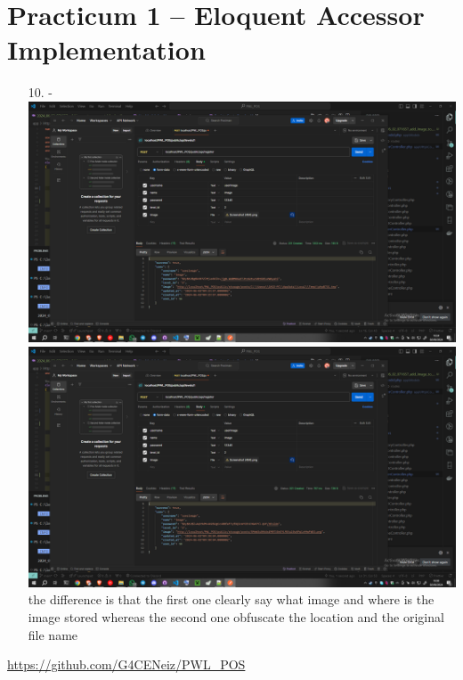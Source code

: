 \documentclass[12pt,titlepage]{article}
\begin{document}
\section*{Practicum 1 – Eloquent Accessor Implementation}
\begin{enumerate}
    \item[10.] - \\ \includegraphics[width=.9\textwidth]{images/figures/Screenshot (485).png} \\ \includegraphics[width=.9\textwidth]{images/figures/Screenshot (486).png} \\ the difference is that the first one clearly say what image and where is the image stored whereas the second one obfuscate the location and the original file name
\end{enumerate}
\url{https://github.com/G4CENeiz/PWL_POS}
\end{document}
